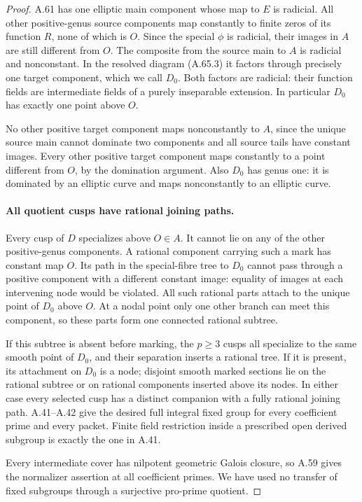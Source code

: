 \begin{proof}
A.61 has one elliptic main component whose
map to \(E\) is radicial. All other
positive-genus source components map
constantly to finite zeros of its function
\(R\), none of which is \(O\). Since the
special \(\phi\) is radicial, their images
in \(A\) are still different from \(O\).
The composite from the source main to
\(A\) is radicial and nonconstant. In
the resolved diagram (A.65.3) it factors
through precisely one target component,
which we call \(D_0\). Both factors are
radicial: their function fields are
intermediate fields of a purely inseparable
extension. In particular \(D_0\) has
exactly one point above \(O\).

No other positive target component maps
nonconstantly to \(A\), since the unique
source main cannot dominate two components
and all source tails have constant images.
Every other positive target component
maps constantly to a point different from
\(O\), by the domination argument. Also
\(D_0\) has genus one: it is dominated
by an elliptic curve and maps nonconstantly
to an elliptic curve.

\paragraph{All quotient cusps have rational joining paths.}
Every cusp of \(D\) specializes above
\(O\in A\). It cannot lie on any of the
other positive-genus components. A rational
component carrying such a mark has constant
map \(O\). Its path in the special-fibre
tree to \(D_0\) cannot pass through a
positive component with a different
constant image: equality of images at
each intervening node would be violated.
All such rational parts attach to the
unique point of \(D_0\) above \(O\).
At a nodal point only one other branch can
meet this component, so these parts form
one connected rational subtree.

If this subtree is absent before marking,
the \(p\ge3\) cusps all specialize to
the same smooth point of \(D_0\), and
their separation inserts a rational tree.
If it is present, its attachment on
\(D_0\) is a node; disjoint smooth marked
sections lie on the rational subtree or
on rational components inserted above
its nodes. In either case every selected
cusp has a distinct companion with a
fully rational joining path. A.41--A.42
give the desired full integral fixed
group for every coefficient prime and
every packet. Finite field restriction
inside a prescribed open derived subgroup
is exactly the one in A.41.

Every intermediate cover has nilpotent
geometric Galois closure, so A.59 gives
the normalizer assertion at all coefficient
primes. We have used no transfer of fixed
subgroups through a surjective pro-prime
quotient.


\end{proof}
